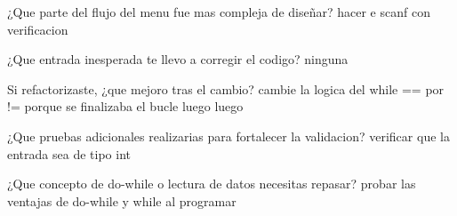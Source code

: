 
\begin{DoxyEnumerate}
\item ¿\+Que parte del flujo del menu fue mas compleja de diseñar? hacer e scanf con verificacion
\item ¿\+Que entrada inesperada te llevo a corregir el codigo? ninguna
\item Si refactorizaste, ¿que mejoro tras el cambio? cambie la logica del while == por != porque se finalizaba el bucle luego luego
\item ¿\+Que pruebas adicionales realizarias para fortalecer la validacion? verificar que la entrada sea de tipo {\ttfamily int}
\item ¿\+Que concepto de {\ttfamily do-\/while} o lectura de datos necesitas repasar? probar las ventajas de do-\/while y while al programar 
\end{DoxyEnumerate}